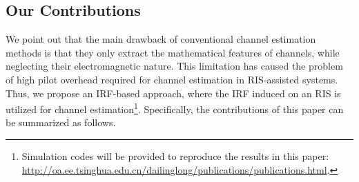 \documentclass[journal,twocolumn]{IEEEtran}
\theoremstyle{nonumberplain}
\begin{document}
\subsection{Our Contributions}
\label{Our Contributions}

We point out that the main drawback of conventional channel estimation methods is that they only extract the mathematical features of channels, while neglecting their electromagnetic nature. This limitation has caused the problem of high pilot overhead required for channel estimation in RIS-assisted systems. Thus, we propose an \ac{IRF}-based approach, where the \ac{IRF} induced on an RIS is utilized for channel estimation\footnote{Simulation codes will be provided to reproduce the results in this paper: \url{http://oa.ee.tsinghua.edu.cn/dailinglong/publications/publications.html}.}.
Specifically, the contributions of this paper can be summarized as follows.
\end{document}
